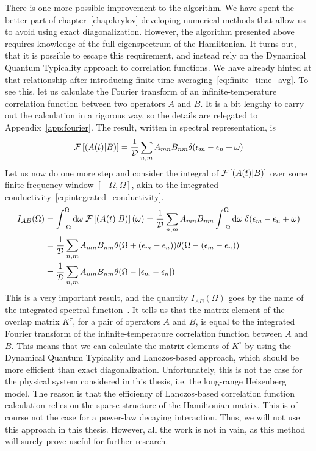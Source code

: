   There is one more possible improvement to the algorithm. We have spent the better part of chapter~\ref{chap:krylov}
developing numerical methods that allow us to avoid using exact diagonalization. However, the algorithm presented
above requires knowledge of the full eigenspectrum of the Hamiltonian. It turns out, that it is possible
to escape this requirement, and instead rely on the Dynamical Quantum Typicality approach to correlation functions.
We have already hinted at that relationship after introducing finite time averaging~\eqref{eq:finite_time_avg}.
To see this, let us calculate the Fourier transform of an infinite-temperature correlation function between
two operators \(A\) and \(B\). It is a bit lengthy to carry out the calculation in a rigorous way, so the
details are relegated to Appendix~\ref{app:fourier}. The result, written in spectral representation, is
\begin{equation}  
  \mathcal{F}\left[\left(A(t) \middle| B\right)\right] = \frac{1}{\mathcal{D}}\sum_{n,m} A_{mn} B_{nm} \delta(\epsilon_m-\epsilon_n+\omega)
  \label{eq:fourier_corr}
\end{equation}
Let us now do one more step and consider the integral of \(\mathcal{F}\left[\left(A(t) \middle| B\right)\right]\) over
some finite frequency window \([-\Omega, \Omega]\), akin to the integrated conductivity~\eqref{eq:integrated_conductivity}.
\begin{align}
    I_{AB}(\Omega) &= \int_{-\Omega}^{\Omega} \mathrm{d}\omega\; \mathcal{F}\left[\left(A(t) \middle| B\right)\right](\omega) =
    \frac{1}{\mathcal{D}}\sum_{n,m} A_{mn} B_{nm} \int_{-\Omega}^{\Omega} \mathrm{d}\omega \;
    \delta(\epsilon_m-\epsilon_n+\omega) \nonumber \\ &= \frac{1}{\mathcal{D}}\sum_{n,m} A_{mn} B_{nm}
    \theta(\Omega + (\epsilon_m-\epsilon_n))\theta(\Omega - (\epsilon_m-\epsilon_n)) \nonumber\\
    &= \frac{1}{\mathcal{D}}\sum_{n,m} A_{mn} B_{nm}\theta(\Omega - \abs{\epsilon_m-\epsilon_n})
    \label{eq:integrated_spectral}
\end{align}
This is a very important result, and the quantity \(I_{AB}(\Omega)\) goes by the name of
the integrated spectral function~\autocite{Vidmar2021}.
It tells us that the matrix element of the overlap matrix \(K^{\tau}\),
for a pair of operators \(A\) and \(B\), is equal to the integrated Fourier transform of the infinite-temperature
correlation function between \(A\) and \(B\). This means that we can calculate the matrix elements of \(K^{\tau}\)
by using the Dynamical Quantum Typicality and Lanczos-based approach, which should be more efficient than exact diagonalization.
Unfortunately, this is not the case for the  physical system considered in this thesis,
i.e. the long-range Heisenberg model. The reason is that the efficiency of Lanczos-based
correlation function calculation relies on the sparse structure of the Hamiltonian matrix.
This is of course not the case for a power-law decaying interaction. Thus, we will not use this approach
in this thesis. However, all the work is not in vain, as this method will surely prove useful
for further research.

